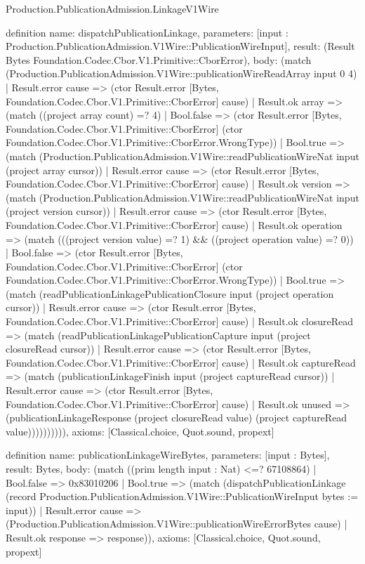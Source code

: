 \begin{lexlean}{Production.PublicationAdmission.LinkageV1Wire}
\begin{semanticmodule}
definition{
  name: dispatchPublicationLinkage,
  parameters: [input : Production.PublicationAdmission.V1Wire::PublicationWireInput],
  result: (Result Bytes Foundation.Codec.Cbor.V1.Primitive::CborError),
  body: (match (Production.PublicationAdmission.V1Wire::publicationWireReadArray input 0 4)
    | Result.error cause => (ctor Result.error [Bytes, Foundation.Codec.Cbor.V1.Primitive::CborError] cause)
    | Result.ok array => (match ((project array count) =? 4)
      | Bool.false => (ctor Result.error [Bytes, Foundation.Codec.Cbor.V1.Primitive::CborError] (ctor Foundation.Codec.Cbor.V1.Primitive::CborError.WrongType))
      | Bool.true => (match (Production.PublicationAdmission.V1Wire::readPublicationWireNat input (project array cursor))
        | Result.error cause => (ctor Result.error [Bytes, Foundation.Codec.Cbor.V1.Primitive::CborError] cause)
        | Result.ok version => (match (Production.PublicationAdmission.V1Wire::readPublicationWireNat input (project version cursor))
          | Result.error cause => (ctor Result.error [Bytes, Foundation.Codec.Cbor.V1.Primitive::CborError] cause)
          | Result.ok operation => (match (((project version value) =? 1) && ((project operation value) =? 0))
            | Bool.false => (ctor Result.error [Bytes, Foundation.Codec.Cbor.V1.Primitive::CborError] (ctor Foundation.Codec.Cbor.V1.Primitive::CborError.WrongType))
            | Bool.true => (match (readPublicationLinkagePublicationClosure input (project operation cursor))
              | Result.error cause => (ctor Result.error [Bytes, Foundation.Codec.Cbor.V1.Primitive::CborError] cause)
              | Result.ok closureRead => (match (readPublicationLinkagePublicationCapture input (project closureRead cursor))
                | Result.error cause => (ctor Result.error [Bytes, Foundation.Codec.Cbor.V1.Primitive::CborError] cause)
                | Result.ok captureRead => (match (publicationLinkageFinish input (project captureRead cursor))
                  | Result.error cause => (ctor Result.error [Bytes, Foundation.Codec.Cbor.V1.Primitive::CborError] cause)
                  | Result.ok unused => (publicationLinkageResponse (project closureRead value) (project captureRead value)))))))))),
  axioms: [Classical.choice, Quot.sound, propext]
}

definition{
  name: publicationLinkageWireBytes,
  parameters: [input : Bytes],
  result: Bytes,
  body: (match ((prim length input : Nat) <=? 67108864)
    | Bool.false => 0x83010206
    | Bool.true => (match (dispatchPublicationLinkage (record Production.PublicationAdmission.V1Wire::PublicationWireInput {bytes := input}))
      | Result.error cause => (Production.PublicationAdmission.V1Wire::publicationWireErrorBytes cause)
      | Result.ok response => response)),
  axioms: [Classical.choice, Quot.sound, propext]
}


\end{semanticmodule}
\end{lexlean}
